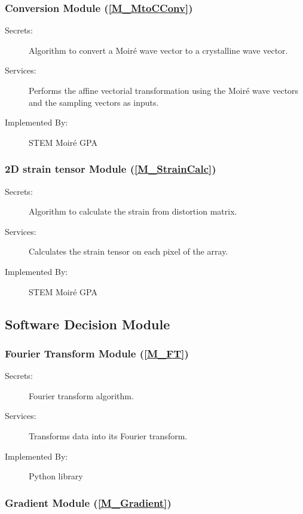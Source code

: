 \documentclass[12pt, titlepage]{article}
\newcommand{\progname}{STEM Moir{\'e} GPA}
\begin{document}
\subsubsection{Conversion Module (\texorpdfstring{\cref{M_MtoCConv}}))}

\begin{description}
\item[Secrets:] Algorithm to convert a Moir{\'e} wave vector to a crystalline 
wave vector.
\item[Services:] Performs the affine vectorial transformation using the 
Moir{\'e} wave vectors and the sampling vectors as inputs.
\item[Implemented By:] \progname{}
\end{description}

\subsubsection{2D strain tensor Module (\texorpdfstring{\cref{M_StrainCalc}}))}

\begin{description}
\item[Secrets:] Algorithm to calculate the strain from distortion matrix.
\item[Services:] Calculates the strain tensor on each pixel of the array.
\item[Implemented By:] \progname{}
\end{description}

\subsection{Software Decision Module}

\subsubsection{Fourier Transform Module (\texorpdfstring{\cref{M_FT}}))}

\begin{description}
\item[Secrets:] Fourier transform algorithm.
\item[Services:] Transforms data into its Fourier transform.
\item[Implemented By:]Python library
\end{description}

\subsubsection{Gradient Module (\texorpdfstring{\cref{M_Gradient}}))}
\end{document}
